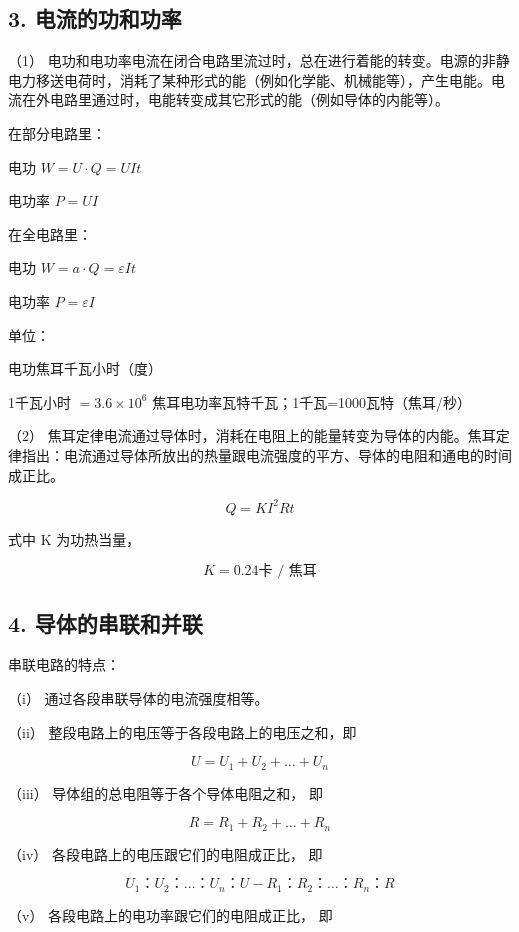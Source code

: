 \subsection{3.
电流的功和功率}\label{ux7535ux6d41ux7684ux529fux548cux529fux7387-1}

（1）
电功和电功率电流在闭合电路里流过时，总在进行着能的转变。电源的非静电力移送电荷时，消耗了某种形式的能（例如化学能、机械能等），产生电能。电流在外电路里通过时，电能转变成其它形式的能（例如导体的内能等）。

在部分电路里：

电功 \(W = U\cdot Q = UIt\)

电功率 \(P = UI\)

在全电路里：

电功 \(W = a \cdot Q = \varepsilon It\)

电功率 \(P = \varepsilon I\)

单位：

电功焦耳千瓦小时（度）

1千瓦小时 \(= 3.6\times 10^{6}\)
焦耳电功率瓦特千瓦；1千瓦=1000瓦特（焦耳/秒）

（2）
焦耳定律电流通过导体时，消耗在电阻上的能量转变为导体的内能。焦耳定律指出：电流通过导体所放出的热量跟电流强度的平方、导体的电阻和通电的时间成正比。

\[
Q=KI^{2}Rt
\]

式中 K 为功热当量，

\[
K = 0.24 \text{卡 / 焦耳}
\]

\subsection{4.
导体的串联和并联}\label{ux5bfcux4f53ux7684ux4e32ux8054ux548cux5e76ux8054}

串联电路的特点：

（i） 通过各段串联导体的电流强度相等。

（ii） 整段电路上的电压等于各段电路上的电压之和，即

\[
U = U_{1} + U_{2} + \dots + U_{n}
\]

（iii） 导体组的总电阻等于各个导体电阻之和， 即

\[
R = R_{1} + R_{2} + \dots + R_{n}
\]

（iv） 各段电路上的电压跟它们的电阻成正比， 即

\[
U_{1}\text{：} U_{2}\text{：} \dots \text{：} U_{n}\text{：} U - R_{1}\text{：} R_{2}\text{：} \dots \text{：} R_{n}\text{：} R
\]

（v） 各段电路上的电功率跟它们的电阻成正比， 即

